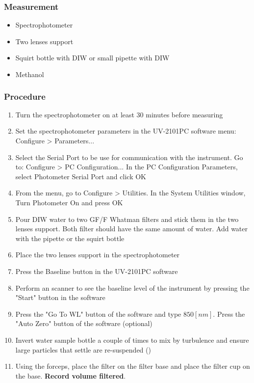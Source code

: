 \begin{appendices}
\subsubsection*{Measurement}
\begin{itemize}
  \item Spectrophotometer
  \item {\color{red} Two lenses support}
  \item Squirt bottle with {\color{red} DIW} or small pipette with {\color{red} DIW} 
  \item Methanol
\end{itemize}
\subsubsection{Procedure}
\begin{enumerate}
  \item Turn the spectrophotometer on at least 30 minutes before measuring
  \item Set the spectrophotometer parameters in the UV-2101PC software menu: Configure > Parameters...
  \item Select the Serial Port to be use for communication with the instrument. Go to: Configure > PC Configuration... In the PC Configuration Parameters, select Photometer Serial Port and click OK
  \item From the menu, go to Configure > Utilities. In the System Utilities window, Turn Photometer On and press OK
  \item Pour DIW water to two GF/F Whatman filters and stick them in the two lenses support. Both filter should have the same amount of water. Add water with the pipette or the squirt bottle
  \item Place the two lenses support in the spectrophotometer
  \item Press the Baseline button in the UV-2101PC software
  \item Perform an scanner to see the baseline level of the instrument by pressing the "Start" button in the software
  \item Press the "Go To WL" button of the software and type $850 [nm]$. Press the "Auto Zero" button of the software (optional)
  \item Invert water sample bottle a couple of times to mix by turbulence and ensure large particles that settle are re-suspended (\cite{Mitchell2002})
  \item \label{item:place_filter} Using the forceps, place the filter on the filter base and place the filter cup on the base. \textbf{Record volume filtered}. 

\end{enumerate}
\end{appendices}
